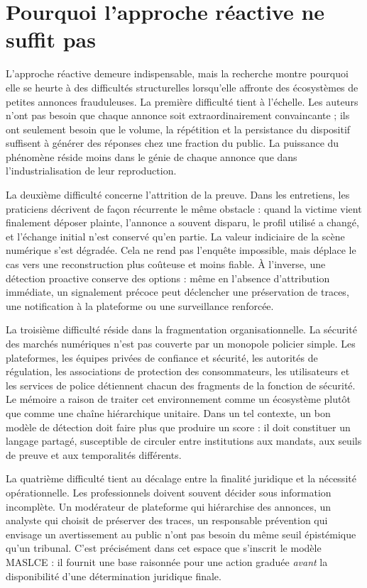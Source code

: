 \documentclass[10pt,a4paper]{article}
\begin{document}
\section{Pourquoi l'approche réactive ne suffit pas}
L'approche réactive demeure indispensable, mais la recherche montre pourquoi elle se heurte à des difficultés structurelles lorsqu'elle affronte des écosystèmes de petites annonces frauduleuses. La première difficulté tient à l'échelle. Les auteurs n'ont pas besoin que chaque annonce soit extraordinairement convaincante ; ils ont seulement besoin que le volume, la répétition et la persistance du dispositif suffisent à générer des réponses chez une fraction du public. La puissance du phénomène réside moins dans le génie de chaque annonce que dans l'industrialisation de leur reproduction.

La deuxième difficulté concerne l'attrition de la preuve. Dans les entretiens, les praticiens décrivent de façon récurrente le même obstacle : quand la victime vient finalement déposer plainte, l'annonce a souvent disparu, le profil utilisé a changé, et l'échange initial n'est conservé qu'en partie. La valeur indiciaire de la scène numérique s'est dégradée. Cela ne rend pas l'enquête impossible, mais déplace le cas vers une reconstruction plus coûteuse et moins fiable. À l'inverse, une détection proactive conserve des options : même en l'absence d'attribution immédiate, un signalement précoce peut déclencher une préservation de traces, une notification à la plateforme ou une surveillance renforcée.

La troisième difficulté réside dans la fragmentation organisationnelle. La sécurité des marchés numériques n'est pas couverte par un monopole policier simple. Les plateformes, les équipes privées de confiance et sécurité, les autorités de régulation, les associations de protection des consommateurs, les utilisateurs et les services de police détiennent chacun des fragments de la fonction de sécurité. Le mémoire a raison de traiter cet environnement comme un écosystème plutôt que comme une chaîne hiérarchique unitaire. Dans un tel contexte, un bon modèle de détection doit faire plus que produire un score : il doit constituer un langage partagé, susceptible de circuler entre institutions aux mandats, aux seuils de preuve et aux temporalités différents.

La quatrième difficulté tient au décalage entre la finalité juridique et la nécessité opérationnelle. Les professionnels doivent souvent décider sous information incomplète. Un modérateur de plateforme qui hiérarchise des annonces, un analyste qui choisit de préserver des traces, un responsable prévention qui envisage un avertissement au public n'ont pas besoin du même seuil épistémique qu'un tribunal. C'est précisément dans cet espace que s'inscrit le modèle MASLCE : il fournit une base raisonnée pour une action graduée \emph{avant} la disponibilité d'une détermination juridique finale.
\end{document}
